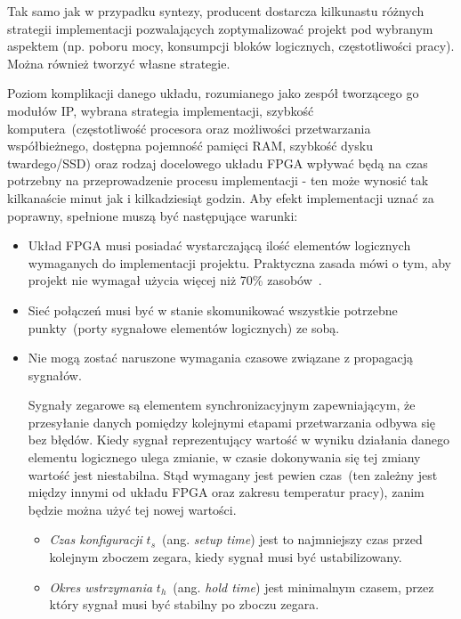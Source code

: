 Tak samo jak w przypadku syntezy, producent dostarcza kilkunastu różnych strategii implementacji pozwalających zoptymalizować projekt pod wybranym aspektem (np. poboru mocy, konsumpcji bloków logicznych, częstotliwości pracy). Można również tworzyć własne strategie.

Poziom komplikacji danego układu, rozumianego jako zespół tworzącego go modułów IP, wybrana strategia implementacji, szybkość komputera~(częstotliwość procesora oraz możliwości przetwarzania współbieżnego, dostępna pojemność pamięci RAM, szybkość dysku twardego/SSD) oraz rodzaj docelowego układu FPGA wpływać będą na czas potrzebny na przeprowadzenie procesu implementacji - ten może wynosić tak kilkanaście minut jak i kilkadziesiąt godzin. Aby efekt implementacji uznać za poprawny, spełnione muszą być następujące warunki:
\begin{itemize}
\item Układ FPGA musi posiadać wystarczającą ilość elementów logicznych wymaganych do implementacji projektu. Praktyczna zasada mówi o tym, aby projekt nie wymagał użycia więcej niż 70\% zasobów~\cite{Designing_with_Xilinx}.
\item Sieć połączeń musi być w stanie skomunikować wszystkie potrzebne punkty~(porty sygnałowe elementów logicznych) ze sobą. 
\item Nie mogą zostać naruszone wymagania czasowe związane z propagacją sygnałów. 

Sygnały zegarowe są elementem synchronizacyjnym zapewniającym, że przesyłanie danych pomiędzy kolejnymi etapami przetwarzania odbywa się bez błędów. Kiedy sygnał reprezentujący wartość w wyniku działania danego elementu logicznego ulega zmianie, w czasie dokonywania się tej zmiany wartość jest niestabilna. Stąd wymagany jest pewien czas~(ten zależny jest między innymi od układu FPGA oraz zakresu temperatur pracy), zanim będzie można użyć tej nowej wartości. 
\begin{itemize}
\item \textit{Czas konfiguracji} $t_s$~(ang. \textit{setup time}) jest to najmniejszy czas przed kolejnym zboczem zegara, kiedy sygnał musi być ustabilizowany.
\item \textit{Okres wstrzymania} $t_h$~(ang. \textit{hold time}) jest minimalnym czasem, przez który sygnał musi być stabilny po zboczu zegara.
\end{itemize}



\end{itemize}
